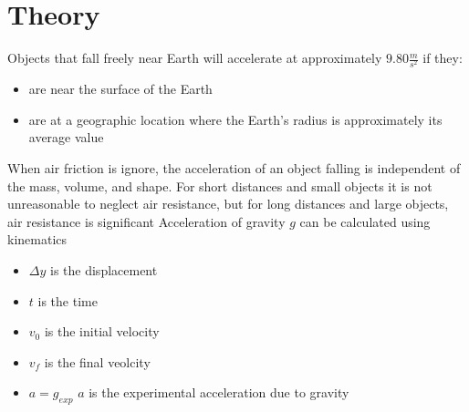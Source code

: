 \chapter{Theory}
Objects that fall freely near Earth will accelerate at approximately $9.80\frac{m}{s^2}$
if they:
\begin{itemize}
  \item are near the surface of the Earth
  \item are at a geographic location where the Earth's radius is approximately its average value
\end{itemize}

  When air friction is ignore, the acceleration of an object falling is 
independent of the mass, volume, and shape. For short distances and small 
objects it is not unreasonable to neglect air resistance, but for long 
distances and large objects, air resistance is significant
Acceleration of gravity $g$ can be calculated using kinematics

\begin{itemize}
  \item $\Delta y$ is the displacement
  \item $t$ is the time
  \item $v_0$ is the initial velocity
  \item $v_f$ is the final veolcity
  \item $a = g_{exp}$ $a$ is the experimental acceleration due to gravity
\end{itemize}

